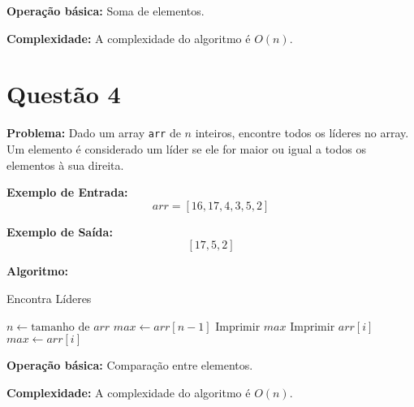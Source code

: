 \documentclass[12pt]{article}
\begin{document}
\textbf{Operação básica:} Soma de elementos.

\textbf{Complexidade:} A complexidade do algoritmo é $O(n)$.

\newpage

\section*{Questão 4}
\textbf{Problema:} Dado um array \texttt{arr} de \(n\) inteiros, encontre todos os líderes no array. Um elemento é considerado um líder se ele for maior ou igual a todos os elementos à sua direita.

\textbf{Exemplo de Entrada:}
\[
arr = [16, 17, 4, 3, 5, 2]
\]

\textbf{Exemplo de Saída:}
\[
[17, 5, 2]
\]

\textbf{Algoritmo:}
\begin{algorithm}
\caption{Encontra Líderes}
\begin{algorithmic}[1]
    \State $n \gets \text{tamanho de } arr$
    \State $max \gets arr[n-1]$
    \State Imprimir $max$
            \State Imprimir $arr[i]$
            \State $max \gets arr[i]$
        \EndIf
    \EndFor
\EndProcedure
\end{algorithmic}
\end{algorithm}

\textbf{Operação básica:} Comparação entre elementos.

\textbf{Complexidade:} A complexidade do algoritmo é $O(n)$.
\end{document}

